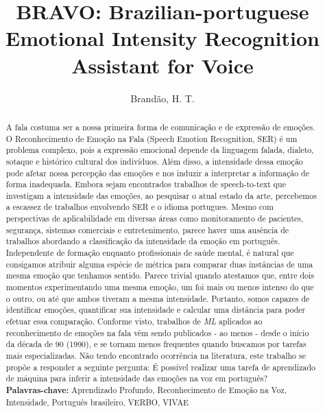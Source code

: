 \documentclass[12pt]{report}
\title{BRAVO: Brazilian-portuguese Emotional Intensity Recognition Assistant for Voice}
\author{Brandão, H. T.}
\begin{document}
\maketitle

\begin{abstract}
A fala costuma ser a nossa primeira forma de comunicação e de expressão de emoções. O Reconhecimento de Emoção na Fala (Speech Emotion Recognition, SER) é um problema complexo, pois a expressão emocional depende da linguagem falada, dialeto, sotaque e histórico cultural dos indivíduos. Além disso, a intensidade dessa emoção pode afetar nossa percepção das emoções e nos induzir a interpretar a informação de forma inadequada. Embora sejam encontrados trabalhos de speech-to-text que investigam a intensidade das emoções, ao pesquisar o atual estado da arte, percebemos a escassez de trabalhos envolvendo SER e o idioma portugues. Mesmo com perspectivas de aplicabilidade em diversas áreas como monitoramento de pacientes, segurança, sistemas comerciais e entretenimento, parece haver uma ausência de trabalhos abordando a classificação da intensidade da emoção em português. Independente de formação enquanto profissionais de saúde mental, é natural que consigamos atribuir alguma espécie de métrica para comparar duas instâncias de uma mesma emoção que tenhamos sentido. Parece trivial quando atestamos que, entre dois momentos experimentando uma mesma emoção, um foi mais ou menos intenso do que o outro, ou até que ambos tiveram a mesma intensidade. Portanto, somos capazes de identificar emoções, quantificar sua intensidade e calcular uma distância para poder efetuar essa comparação. Conforme visto, trabalhos de \textit{ML} aplicados ao reconhecimento de emoções na fala vêm sendo publicados - ao menos - desde o início da década de 90 (1990), e se tornam menos frequentes quando buscamos por tarefas mais especializadas. Não tendo encontrado ocorrência na literatura, este trabalho se propõe a responder a seguinte pergunta: É possível realizar uma tarefa de aprendizado de máquina para inferir a intensidade das emoções na voz em português?\\

\noindent \textbf{Palavras-chave:} Aprendizado Profundo, Reconhecimento de Emoção na Voz, Intensidade, Português brasileiro, VERBO, VIVAE
\end{abstract}
\clearpage
\end{document}
